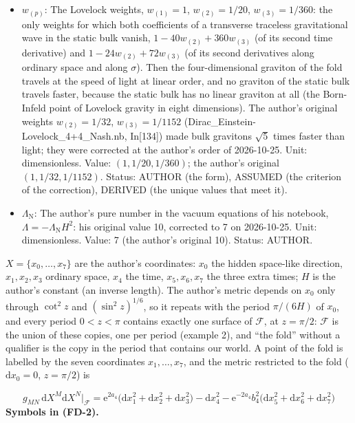 \documentclass[
  10pt,
]{article}
\begin{document}
\begin{itemize}
  Unit: GeV\(^2\). Value: \(-7H^2\); the author's original \(-10H^2\).
  Status: AUTHOR (the term), DERIVED (the value).
\item
  \(w_{(p)}\): The Lovelock weights, \(w_{(1)} = 1\),
  \(w_{(2)} = 1/20\), \(w_{(3)} = 1/360\): the only weights for which
  both coefficients of a transverse traceless gravitational wave in the
  static bulk vanish, \(1 - 40w_{(2)} + 360w_{(3)}\) (of its second time
  derivative) and \(1 - 24w_{(2)} + 72w_{(3)}\) (of its second
  derivatives along ordinary space and along \(\sigma\)). Then the
  four-dimensional graviton of the fold travels at the speed of light at
  linear order, and no graviton of the static bulk travels faster,
  because the static bulk has no linear graviton at all (the Born-Infeld
  point of Lovelock gravity in eight dimensions). The author's original
  weights \(w_{(2)} = 1/32\), \(w_{(3)} = 1/1152\)
  (Dirac\_Einstein-Lovelock\_4+4\_Nash.nb, In{[}134{]}) made bulk
  gravitons \(\sqrt5\) times faster than light; they were corrected at
  the author's order of 2026-10-25. Unit: dimensionless. Value:
  \((1, 1/20, 1/360)\); the author's original \((1, 1/32, 1/1152)\).
  Status: AUTHOR (the form), ASSUMED (the criterion of the correction),
  DERIVED (the unique values that meet it).
\item
  \(\Lambda_{\mathrm{N}}\): The author's pure number in the vacuum
  equations of his notebook, \(\Lambda = -\Lambda_{\mathrm{N}}H^2\): his
  original value 10, corrected to 7 on 2026-10-25. Unit: dimensionless.
  Value: 7 (the author's original 10). Status: AUTHOR.
\end{itemize}

\(X = \{x_0, \dots, x_7\}\) are the author's coordinates: \(x_0\) the
hidden space-like direction, \(x_1, x_2, x_3\) ordinary space, \(x_4\)
the time, \(x_5, x_6, x_7\) the three extra times; \(H\) is the author's
constant (an inverse length). The author's metric depends on \(x_0\)
only through \(\cot^2z\) and \((\sin^2z)^{1/6}\), so it repeats with the
period \(\pi/(6H)\) of \(x_0\), and every period \(0 < z < \pi\)
contains exactly one surface of \(\mathcal{F}\), at \(z = \pi/2\):
\(\mathcal{F}\) is the union of these copies, one per period (example
2), and ``the fold'' without a qualifier is the copy in the period that
contains our world. A point of the fold is labelled by the seven
coordinates \(x_1, \dots, x_7\), and the metric restricted to the fold
(\(\mathrm{d}x_0 = 0\), \(z = \pi/2\)) is

\[
g_{MN}\,\mathrm{d}X^M\mathrm{d}X^N\big\vert_{\mathcal{F}} = \mathrm{e}^{2a_4}\big(\mathrm{d}x_1^2 + \mathrm{d}x_2^2 + \mathrm{d}x_3^2\big)
 - \mathrm{d}x_4^2 - \mathrm{e}^{-2a_4}b_4^2\big(\mathrm{d}x_5^2 + \mathrm{d}x_6^2 + \mathrm{d}x_7^2\big) \tag{FD-2}
\] \textbf{Symbols in (FD-2).}
\end{document}
